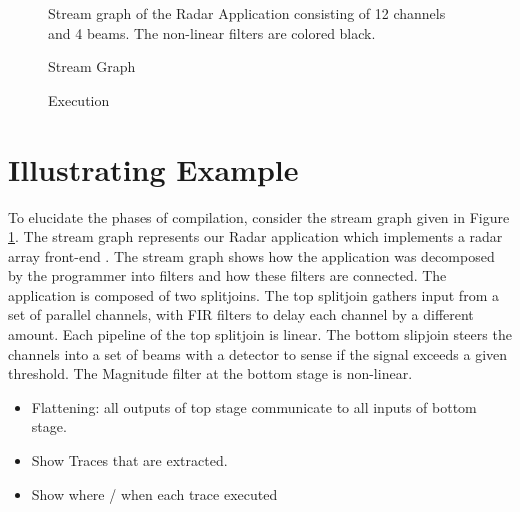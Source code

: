 \begin{figure}
\centering
{}
\caption{Stream graph of the Radar Application consisting of 12
channels and 4 beams. The non-linear filters are colored black. 
\label{fig:beam-graph}}
\end{figure}

\begin{figure}
\caption{Stream Graph
\label{fig:target-graph}}
\end{figure}

\begin{figure}
\caption{Execution
\label{fig:Execution}}
\end{figure}


\section{Illustrating Example}
\label{sec:example}
To elucidate the phases of compilation, consider the stream graph
given in Figure \ref{fig:beam-graph}.  The stream graph represents our
Radar application which implements a radar array front-end \cite{pca}.
The stream graph shows how the application was decomposed by the
programmer into filters and how these filters are connected.  The
application is composed of two splitjoins.  The top splitjoin gathers
input from a set of parallel channels, with FIR filters to delay each
channel by a different amount.  Each pipeline of the top splitjoin is
linear.  The bottom slipjoin steers the channels into a set of beams
with a detector to sense if the signal exceeds a given threshold.  
The Magnitude filter at the bottom stage is non-linear.  

\begin{itemize}
\item Flattening: all outputs of top stage communicate to all inputs
of bottom stage.
\item Show Traces that are extracted.
\item Show where / when each trace executed
\end{itemize}
